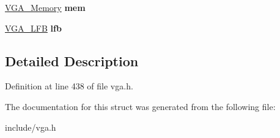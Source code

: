 \begin{DoxyCompactItemize}
\item 
\hypertarget{structVGA__Type_ade860ae7b9935ad2fd4613758b998c1b}{\hyperlink{structVGA__Memory}{V\-G\-A\-\_\-\-Memory} {\bfseries mem}}\label{structVGA__Type_ade860ae7b9935ad2fd4613758b998c1b}

\item 
\hypertarget{structVGA__Type_ab46a6c5770cc6e5a528e6456e998af78}{\hyperlink{structVGA__LFB}{V\-G\-A\-\_\-\-L\-F\-B} {\bfseries lfb}}\label{structVGA__Type_ab46a6c5770cc6e5a528e6456e998af78}

\end{DoxyCompactItemize}


\subsection{Detailed Description}


Definition at line 438 of file vga.\-h.



The documentation for this struct was generated from the following file\-:\begin{DoxyCompactItemize}
\item 
include/vga.\-h\end{DoxyCompactItemize}
